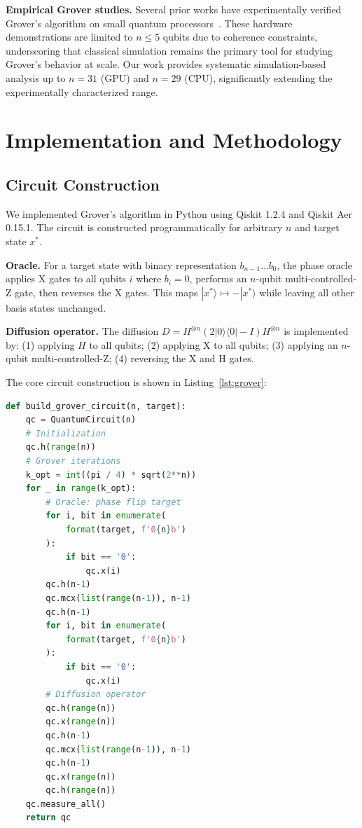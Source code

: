 \documentclass[sigconf, authorversion, nonacm]{acmart}
\begin{document}
\textbf{Empirical Grover studies.} Several prior works have experimentally verified Grover's algorithm on small quantum processors~\cite{Chuang1998, Figgatt2017}. These hardware demonstrations are limited to $n \leq 5$ qubits due to coherence constraints, underscoring that classical simulation remains the primary tool for studying Grover's behavior at scale. Our work provides systematic simulation-based analysis up to $n=31$ (GPU) and $n=29$ (CPU), significantly extending the experimentally characterized range.

\section{Implementation and Methodology}

\subsection{Circuit Construction}

We implemented Grover's algorithm in Python using Qiskit 1.2.4 and Qiskit Aer 0.15.1. The circuit is constructed programmatically for arbitrary $n$ and target state $x^*$.

\textbf{Oracle.} For a target state with binary representation $b_{n-1}\ldots b_0$, the phase oracle applies X gates to all qubits $i$ where $b_i = 0$, performs an $n$-qubit multi-controlled-Z gate, then reverses the X gates. This maps $|x^*\rangle \mapsto -|x^*\rangle$ while leaving all other basis states unchanged.

\textbf{Diffusion operator.} The diffusion $D = H^{\otimes n}(2|0\rangle\langle 0| - I)H^{\otimes n}$ is implemented by: (1) applying $H$ to all qubits; (2) applying X to all qubits; (3) applying an $n$-qubit multi-controlled-Z; (4) reversing the X and H gates.

The core circuit construction is shown in Listing~\ref{lst:grover}:

\begin{lstlisting}[language=Python, caption={Grover circuit construction (simplified)}, label={lst:grover}]
def build_grover_circuit(n, target):
    qc = QuantumCircuit(n)
    # Initialization
    qc.h(range(n))
    # Grover iterations
    k_opt = int((pi / 4) * sqrt(2**n))
    for _ in range(k_opt):
        # Oracle: phase flip target
        for i, bit in enumerate(
            format(target, f'0{n}b')
        ):
            if bit == '0':
                qc.x(i)
        qc.h(n-1)
        qc.mcx(list(range(n-1)), n-1)
        qc.h(n-1)
        for i, bit in enumerate(
            format(target, f'0{n}b')
        ):
            if bit == '0':
                qc.x(i)
        # Diffusion operator
        qc.h(range(n))
        qc.x(range(n))
        qc.h(n-1)
        qc.mcx(list(range(n-1)), n-1)
        qc.h(n-1)
        qc.x(range(n))
        qc.h(range(n))
    qc.measure_all()
    return qc
\end{lstlisting}
\end{document}
